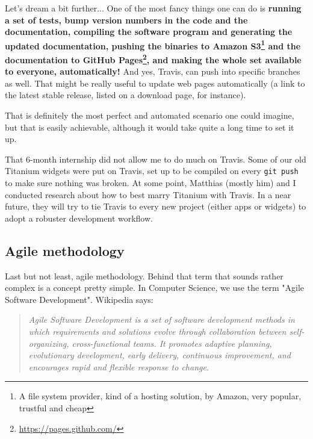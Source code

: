 \medskip

Let's dream a bit further... One of the most fancy things one can do is \textbf{running a set of tests, bump version numbers in the code and the documentation, compiling the software program and generating the updated documentation, pushing the binaries to Amazon S3\footnote{A file system provider, kind of a hosting solution, by Amazon, very popular, trustful and cheap} and the documentation to GitHub Pages\footnote{\href{https://pages.github.com/}{https://pages.github.com/}}, and making the whole set available to everyone, automatically!} And yes, Travis, can push into specific branches as well. That might be really useful to update web pages automatically (a link to the latest stable release, listed on a download page, for instance).

\medskip

That is definitely the most perfect and automated scenario one could imagine, but that is easily achievable, although it would take quite a long time to set it up.

\bigskip

That 6-month internship did not allow me to do much on Travis. Some of our old Titanium widgets were put on Travis, set up to be compiled on every \lstinline{git push} to make sure nothing was broken. At some point, Matthias (mostly him) and I conducted research about how to best marry Titanium with Travis. In a near future, they will try to tie Travis to every new project (either apps or widgets) to adopt a robuster development workflow.

\subsection{Agile methodology}\label{agile-methodology}

Last but not least, agile methodology. Behind that term that sounds rather complex is a concept pretty simple. In Computer Science, we use the term "Agile Software Development". Wikipedia says:

\begin{quote}
\textit{Agile Software Development is a set of software development methods in which requirements and solutions evolve through collaboration between self-organizing, cross-functional teams. It promotes adaptive planning, evolutionary development, early delivery, continuous improvement, and encourages rapid and flexible response to change.}
\end{quote}

